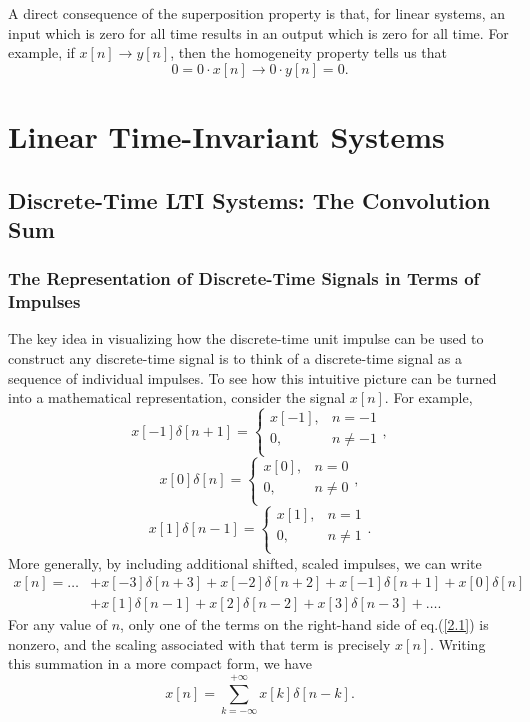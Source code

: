 \documentclass[a4paper,twoside]{book}
\begin{document}
A direct consequence of the superposition property is that, for linear systems, an input which is zero for all time results in an output which is zero for all time. For example, if $x[n]\to y[n]$, then the homogeneity property tells us that
\begin{equation}
    0=0\cdot x[n]\to0\cdot y[n]=0.
    \label{1.125}
\end{equation}

\chapter{Linear Time-Invariant Systems}
\section{Discrete-Time LTI Systems: The Convolution Sum}
\subsection{The Representation of Discrete-Time Signals in Terms of Impulses}

The key idea in visualizing how the discrete-time unit impulse can be used to construct any discrete-time signal is to think of a discrete-time signal as a sequence of individual impulses. To see how this intuitive picture can be turned into a mathematical representation, consider the signal $x[n]$. For example, $$\left.x[-1]\delta[n+1]=\left\{\begin{array}{ll}{x[-1],}&{n=-1}\\{0,}&{n\neq-1}\\\end{array}\right.\right.,$$$$x[0]\delta[n] = \left\{\begin{array}{ll}{x[0],}&{n = 0}\\{0,}&{n \neq 0}\\\end{array}\right.,$$$$\left.x[1]\delta[n-1]=\left\{\begin{array}{ll}{x[1],}&{n=1}\\{0,}&{n\neq1}\\\end{array}\right.\right..$$ More generally, by including additional shifted, scaled impulses, we can write
\begin{equation}
    \begin{aligned}x[n]=\dots&+ x[-3]\delta[n+3]+ x[-2]\delta[n+2]+ x[-1]\delta[n+1]+ x[0]\delta[n]\\&+ x[1]\delta[n-1]+x[2]\delta[n-2]+x[3]\delta[n-3]+\ldots.\end{aligned}
    \label{2.1}
\end{equation}
For any value of $n$, only one of the terms on the right-hand side of eq.\;(\ref{2.1}) is nonzero, and the scaling associated with that term is precisely $x[n]$. Writing this summation in a more compact form, we have
\begin{equation}
    x[n]=\sum_{k=-\infty}^{+\infty}x[k]\delta[n-k].
    \label{2.2}
\end{equation}
\end{document}
